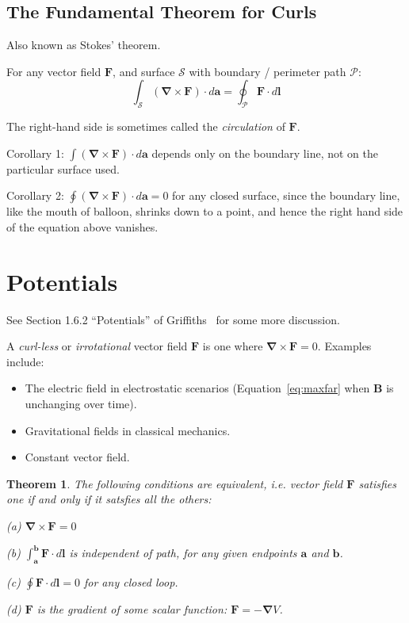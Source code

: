 \documentclass[a4paper]{article}
\theoremstyle{plain}
\newtheorem{theorem}{Theorem}
\theoremstyle{definition}
\newcommand{\vect}[1]{\textbf{#1}}
\newcommand{\del}{\bm{\nabla}}
\begin{document}
\subsection{The Fundamental Theorem for Curls}
\label{sec:stokesthm}

Also known as Stokes' theorem.

For any vector field $\vect{F}$, and surface $\mathcal{S}$ with
boundary / perimeter path $\mathcal{P}$:
\begin{equation}
\int_{\mathcal{S}} (\del \times \vect{F}) \cdot d\vect{a} = \oint_{\mathcal{P}} \vect{F} \cdot d\vect{l}
\end{equation}

The right-hand side is sometimes called the {\em circulation} of
$\vect{F}$.

Corollary 1: $\int (\del \times \vect{F}) \cdot d\vect{a}$ depends
only on the boundary line, not on the particular surface used.

Corollary 2: $\oint (\del \times \vect{F}) \cdot d\vect{a} = 0$ for
any closed surface, since the boundary line, like the mouth of
balloon, shrinks down to a point, and hence the right hand side of the
equation above vanishes.


\section{Potentials}
\label{sec:potentials}

See Section 1.6.2 ``Potentials'' of Griffiths~\cite{Griffiths1998} for
some more discussion.

A {\em curl-less} or {\em irrotational} vector field $\vect{F}$ is one
where $\del \times \vect{F} = 0$.
Examples include:
\begin{itemize}
\item The electric field in electrostatic scenarios
  (Equation~\eqref{eq:maxfar} when $\vect{B}$ is unchanging over
  time).
\item Gravitational fields in classical mechanics.
\item Constant vector field.
\end{itemize}

\begin{theorem}
\label{thm:irrotationalfieldproperties}
The following conditions are equivalent, i.e. vector field $\vect{F}$
satisfies one if and only if it satsfies all the others:

(a) $\del \times \vect{F} = 0$

(b) $\int_{\vect{a}}^{\vect{b}} \vect{F} \cdot d\vect{l}$ is
independent of path, for any given endpoints $\vect{a}$ and
$\vect{b}$.

(c) $\oint \vect{F} \cdot d\vect{l} = 0$ for any closed loop.

(d) $\vect{F}$ is the gradient of some scalar function:
$\vect{F} = -\del V$.
\end{theorem}
\end{document}
